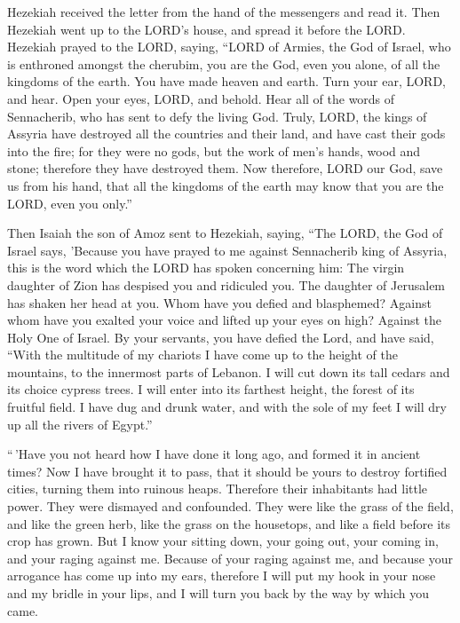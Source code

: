  Hezekiah received the letter from the hand of the
messengers and read it. Then Hezekiah went up to the LORD's house, and
spread it before the LORD.  Hezekiah prayed to the LORD,
saying,  ``LORD of Armies, the God of Israel, who is
enthroned amongst the cherubim, you are the God, even you alone, of all
the kingdoms of the earth. You have made heaven and earth. 
Turn your ear, LORD, and hear. Open your eyes, LORD, and behold. Hear
all of the words of Sennacherib, who has sent to defy the living God.
 Truly, LORD, the kings of Assyria have destroyed all the
countries and their land,  and have cast their gods into
the fire; for they were no gods, but the work of men's hands, wood and
stone; therefore they have destroyed them.  Now therefore,
LORD our God, save us from his hand, that all the kingdoms of the earth
may know that you are the LORD, even you only.''

 Then Isaiah the son of Amoz sent to Hezekiah, saying,
``The LORD, the God of Israel says, 'Because you have prayed to me
against Sennacherib king of Assyria,  this is the word
which the LORD has spoken concerning him: The virgin daughter of Zion
has despised you and ridiculed you. The daughter of Jerusalem has shaken
her head at you.  Whom have you defied and blasphemed?
Against whom have you exalted your voice and lifted up your eyes on
high? Against the Holy One of Israel.  By your servants,
you have defied the Lord, and have said, ``With the multitude of my
chariots I have come up to the height of the mountains, to the innermost
parts of Lebanon. I will cut down its tall cedars and its choice cypress
trees. I will enter into its farthest height, the forest of its fruitful
field.  I have dug and drunk water, and with the sole of my
feet I will dry up all the rivers of Egypt.''

 ``\,'Have you not heard how I have done it long ago, and
formed it in ancient times? Now I have brought it to pass, that it
should be yours to destroy fortified cities, turning them into ruinous
heaps.  Therefore their inhabitants had little power. They
were dismayed and confounded. They were like the grass of the field, and
like the green herb, like the grass on the housetops, and like a field
before its crop has grown.  But I know your sitting down,
your going out, your coming in, and your raging against me.
 Because of your raging against me, and because your
arrogance has come up into my ears, therefore I will put my hook in your
nose and my bridle in your lips, and I will turn you back by the way by
which you came.

